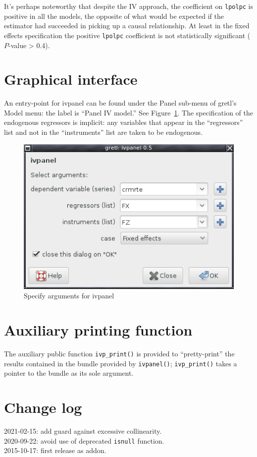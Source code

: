 \documentclass{article}
\begin{document}
It's perhaps noteworthy that despite the IV approach, the coefficient
on \texttt{lpolpc} is positive in all the models, the opposite of what
would be expected if the estimator had succeeded in picking up a
causal relationship. At least in the fixed effects specification the
positive \texttt{lpolpc} coefficient is not statistically significant
($P$-value > 0.4).

\section{Graphical interface}

An entry-point for \textsf{ivpanel} can be found under the
\textsf{Panel} sub-menu of gretl's \textsf{Model} menu: the label is
``Panel IV model.'' See Figure~\ref{fig:gui}. The specification of the
endogenous regressors is implicit: any variables that appear in the
``regressors'' list and not in the ``instruments'' list are taken to
be endogenous.

\begin{figure}[htbp]
  \centering
  \includegraphics[scale=0.6]{ivpanel-gui}
  \caption{Specify arguments for ivpanel}
  \label{fig:gui}
\end{figure}

\section{Auxiliary printing function}

The auxiliary public function \texttt{ivp\_print()} is provided to
``pretty-print'' the results contained in the bundle provided by
\texttt{ivpanel()}; \texttt{ivp\_print()} takes a pointer to the
bundle as its sole argument.

\section{Change log}

2021-02-15: add guard against excessive collinearity.\\
2020-09-22: avoid use of deprecated \texttt{isnull} function.\\
2015-10-17: first release as addon. \\



\end{document}
